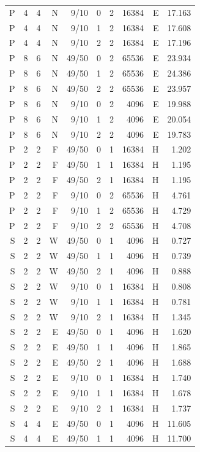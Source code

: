 \begin{longtable}{rrrrrrrrrr}
P & 4 & 4 & N & 9/10 & 0 & 2 & 16384 & E & 17.163 \\
P & 4 & 4 & N & 9/10 & 1 & 2 & 16384 & E & 17.608 \\
P & 4 & 4 & N & 9/10 & 2 & 2 & 16384 & E & 17.196 \\
P & 8 & 6 & N & 49/50 & 0 & 2 & 65536 & E & 23.934 \\
P & 8 & 6 & N & 49/50 & 1 & 2 & 65536 & E & 24.386 \\
P & 8 & 6 & N & 49/50 & 2 & 2 & 65536 & E & 23.957 \\
P & 8 & 6 & N & 9/10 & 0 & 2 & 4096 & E & 19.988 \\
P & 8 & 6 & N & 9/10 & 1 & 2 & 4096 & E & 20.054 \\
P & 8 & 6 & N & 9/10 & 2 & 2 & 4096 & E & 19.783 \\
P & 2 & 2 & F & 49/50 & 0 & 1 & 16384 & H & 1.202 \\
P & 2 & 2 & F & 49/50 & 1 & 1 & 16384 & H & 1.195 \\
P & 2 & 2 & F & 49/50 & 2 & 1 & 16384 & H & 1.195 \\
P & 2 & 2 & F & 9/10 & 0 & 2 & 65536 & H & 4.761 \\
P & 2 & 2 & F & 9/10 & 1 & 2 & 65536 & H & 4.729 \\
P & 2 & 2 & F & 9/10 & 2 & 2 & 65536 & H & 4.708 \\
S & 2 & 2 & W & 49/50 & 0 & 1 & 4096 & H & 0.727 \\
S & 2 & 2 & W & 49/50 & 1 & 1 & 4096 & H & 0.739 \\
S & 2 & 2 & W & 49/50 & 2 & 1 & 4096 & H & 0.888 \\
S & 2 & 2 & W & 9/10 & 0 & 1 & 16384 & H & 0.808 \\
S & 2 & 2 & W & 9/10 & 1 & 1 & 16384 & H & 0.781 \\
S & 2 & 2 & W & 9/10 & 2 & 1 & 16384 & H & 1.345 \\
S & 2 & 2 & E & 49/50 & 0 & 1 & 4096 & H & 1.620 \\
S & 2 & 2 & E & 49/50 & 1 & 1 & 4096 & H & 1.865 \\
S & 2 & 2 & E & 49/50 & 2 & 1 & 4096 & H & 1.688 \\
S & 2 & 2 & E & 9/10 & 0 & 1 & 16384 & H & 1.740 \\
S & 2 & 2 & E & 9/10 & 1 & 1 & 16384 & H & 1.678 \\
S & 2 & 2 & E & 9/10 & 2 & 1 & 16384 & H & 1.737 \\
S & 4 & 4 & E & 49/50 & 0 & 1 & 4096 & H & 11.605 \\
S & 4 & 4 & E & 49/50 & 1 & 1 & 4096 & H & 11.700 \\

\end{longtable}
